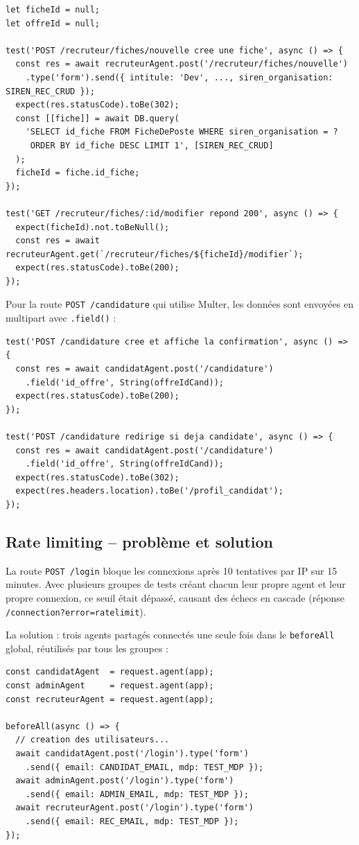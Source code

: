 \documentclass[12pt,a4paper]{article}
\begin{document}
\begin{lstlisting}
let ficheId = null;
let offreId = null;

test('POST /recruteur/fiches/nouvelle cree une fiche', async () => {
  const res = await recruteurAgent.post('/recruteur/fiches/nouvelle')
    .type('form').send({ intitule: 'Dev', ..., siren_organisation: SIREN_REC_CRUD });
  expect(res.statusCode).toBe(302);
  const [[fiche]] = await DB.query(
    'SELECT id_fiche FROM FicheDePoste WHERE siren_organisation = ?
     ORDER BY id_fiche DESC LIMIT 1', [SIREN_REC_CRUD]
  );
  ficheId = fiche.id_fiche;
});

test('GET /recruteur/fiches/:id/modifier repond 200', async () => {
  expect(ficheId).not.toBeNull();
  const res = await recruteurAgent.get(`/recruteur/fiches/${ficheId}/modifier`);
  expect(res.statusCode).toBe(200);
});
\end{lstlisting}

Pour la route \texttt{POST /candidature} qui utilise Multer, les données sont envoyées en multipart avec \texttt{.field()} :

\begin{lstlisting}
test('POST /candidature cree et affiche la confirmation', async () => {
  const res = await candidatAgent.post('/candidature')
    .field('id_offre', String(offreIdCand));
  expect(res.statusCode).toBe(200);
});

test('POST /candidature redirige si deja candidate', async () => {
  const res = await candidatAgent.post('/candidature')
    .field('id_offre', String(offreIdCand));
  expect(res.statusCode).toBe(302);
  expect(res.headers.location).toBe('/profil_candidat');
});
\end{lstlisting}

\subsection{Rate limiting -- problème et solution}

La route \texttt{POST /login} bloque les connexions après 10 tentatives par IP sur 15 minutes. Avec plusieurs groupes de tests créant chacun leur propre agent et leur propre connexion, ce seuil était dépassé, causant des échecs en cascade (réponse \texttt{/connection?error=ratelimit}).

La solution : trois agents partagés connectés une seule fois dans le \texttt{beforeAll} global, réutilisés par tous les groupes :

\begin{lstlisting}
const candidatAgent  = request.agent(app);
const adminAgent     = request.agent(app);
const recruteurAgent = request.agent(app);

beforeAll(async () => {
  // creation des utilisateurs...
  await candidatAgent.post('/login').type('form')
    .send({ email: CANDIDAT_EMAIL, mdp: TEST_MDP });
  await adminAgent.post('/login').type('form')
    .send({ email: ADMIN_EMAIL, mdp: TEST_MDP });
  await recruteurAgent.post('/login').type('form')
    .send({ email: REC_EMAIL, mdp: TEST_MDP });
});
\end{lstlisting}
\end{document}
